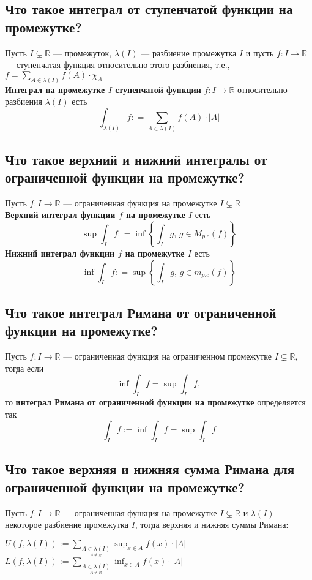 \documentclass[a4paper]{article}
\begin{document}
\subsection{Что такое интеграл от ступенчатой функции на промежутке?}
Пусть $I \subsetneq \mathbb{R}$ — промежуток, $\lambda(I)$ — разбиение промежутка $I$ и пусть $f:I \to \mathbb{R}$ — ступенчатая функция относительно этого разбиения, т.е., $f = \displaystyle\sum_{A \in \lambda(I)}f(A) \cdot \chi_A$\\[2mm]
\indent \textbf{Интеграл на промежутке $I$ ступенчатой функции} $f:I \to \mathbb{R}$ относительно разбиения $\lambda(I)$ есть
$$
\boxed{\int_{\lambda(I)}f: =  \sum_{A \in \lambda(I)} f(A)\cdot |A|}
$$

\subsection{Что такое верхний и нижний интегралы от ограниченной функции на промежутке?}
Пусть $f: I \to \mathbb{R}$ — ограниченная функция на промежутке $I \subsetneq \mathbb{R}$\\[2mm]
\indent \textbf{Верхний интеграл функции $f$ на промежутке $I$} есть
$$
\sup \int_I f  : = \inf  \left\{ \int_I g  , \, g \in M_{p.c}(f)\right\}
$$
\indent \textbf{Нижний интеграл функции $f$ на промежутке $I$} есть
$$
\inf \int_I f  : = \sup  \left\{ \int_I g  , \, g \in m_{p.c}(f)\right\}
$$

\subsection{Что такое интеграл Римана от ограниченной функции на промежутке?}
\label{1.15}
Пусть $f: I \to \mathbb{R}$ — ограниченная функция на ограниченном промежутке $I \subsetneq \mathbb{R}$, тогда если 
$$\inf\int_If=\sup\int_If,$$
то \textbf{интеграл Римана от ограниченной функции на промежутке} определяется так
$$\boxed{\int_If:=\inf\int_If=\sup\int_If}$$

\subsection{Что такое верхняя и нижняя сумма Римана для ограниченной функции на промежутке?}
Пусть $f: I \to \mathbb{R}$ — ограниченная функция на промежутке $I \subsetneq \mathbb{R}$ и $\lambda(I)$ — некоторое разбиение промежутка $I$, тогда верхняя и нижняя суммы Римана:
\begin{center}
    $U(f,\lambda(I)):=\displaystyle\sum_{\underset{A\ne\varnothing}{ A\in\lambda(I)}} \sup_{x\in A} f(x)\cdot\left|A\right|$\\[2mm]
    $L(f,\lambda(I)):=\displaystyle\sum_{\underset{A\ne\varnothing}{ A\in\lambda(I)}} \inf_{x\in A} f(x)\cdot\left|A\right|$
\end{center}
\end{document}
